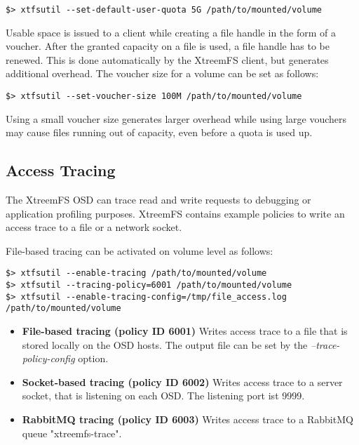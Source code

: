 \documentclass[a4paper,10pt]{book}
\begin{document}
\begin{verbatim}
$> xtfsutil --set-default-user-quota 5G /path/to/mounted/volume
\end{verbatim}

Usable space is issued to a client while creating a file handle in the form of a
voucher. After the granted capacity on a file is used, a file handle has to be
renewed. This is done automatically by the XtreemFS client, but generates
additional overhead. The voucher size for a volume can be set as follows:

\begin{verbatim}
$> xtfsutil --set-voucher-size 100M /path/to/mounted/volume
\end{verbatim}

Using a small voucher size generates larger overhead while using large vouchers
may cause files running out of capacity, even before a quota is used up.

\subsection{Access Tracing}

The XtreemFS OSD can trace read and write requests to debugging or application
profiling purposes. XtreemFS contains example policies to write an access trace to a
file or a network socket.

File-based tracing can be activated on volume level as follows:

\begin{verbatim}
$> xtfsutil --enable-tracing /path/to/mounted/volume
$> xtfsutil --tracing-policy=6001 /path/to/mounted/volume
$> xtfsutil --enable-tracing-config=/tmp/file_access.log /path/to/mounted/volume
\end{verbatim}

\begin{itemize}
  \item \textbf{File-based tracing (policy ID 6001)} Writes access trace to a
    file that is stored locally on the OSD hosts. The output file can be set by
    the \emph{--trace-policy-config} option.
  \item \textbf{Socket-based tracing (policy ID 6002)} Writes access trace to a
    server socket, that is listening on each OSD. The listening port ist 9999.
  \item \textbf{RabbitMQ tracing (policy ID 6003)} Writes access trace to a
    RabbitMQ queue "xtreemfs-trace".
\end{itemize}
\end{document}
